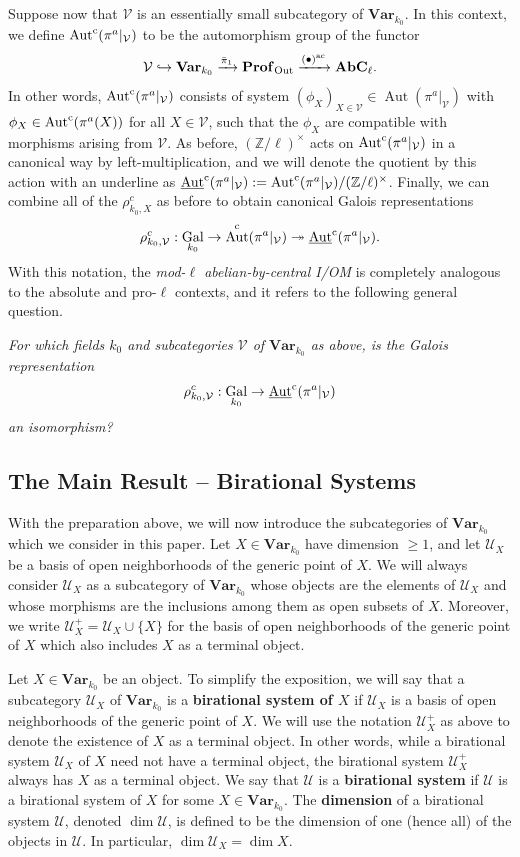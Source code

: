\documentclass[11pt]{amsart}
\theoremstyle{definition}
\theoremstyle{remark}
\numberwithin{equation}{section}
\DeclareMathOperator{\Aut}{Aut}
\DeclareMathOperator{\Gal}{Gal}
\newcommand{\Z}{\mathbb{Z}}
\newcommand{\Vc}{\mathcal{V}}
\newcommand{\Ucal}{\mathcal{U}}
\newcommand{\Autc}{\Aut^{\rm c}}
\newcommand{\UAutc}{\underline{\Aut}^{\rm c}}
\newcommand{\Profinite}{{\mathbf{Prof}_{\rm Out}}}
\newcommand{\Var}{\mathbf{Var}}
\newcommand{\AbC}{\mathbf{AbC}_{\ell}}
\newcommand{\ac}{{\rm ac}}
\newcommand{\Galk}{{\Gal_{k_0}}}
\begin{document}
Suppose now that $\Vc$ is an essentially small subcategory of $\Var_{k_0}$.
In this context, we define $\Autc(\pi^a|_\Vc)$ to be the automorphism group of the functor
\[ \Vc \hookrightarrow \Var_{k_0} \xrightarrow{\bar\pi_1} \Profinite \xrightarrow{(\bullet)^\ac} \AbC. \]
In other words, $\Autc(\pi^a|_\Vc)$ consists of system $(\phi_X)_{X \in \Vc} \in \Aut(\pi^a|_\Vc)$ with $\phi_X \in \Autc(\pi^a(X))$ for all $X \in \Vc$, such that the $\phi_X$ are compatible with morphisms arising from $\Vc$.
As before, $(\Z/\ell)^\times$ acts on $\Autc(\pi^a|_\Vc)$ in a canonical way by left-multiplication, and we will denote the quotient by this action with an underline as $\UAutc(\pi^a|_\Vc) := \Autc(\pi^a|_\Vc)/(\Z/\ell)^\times$.
Finally, we can combine all of the $\rho_{k_0,X}^c$ as before to obtain canonical Galois representations
\[ \rho_{k_0,\Vc}^c : \Galk \rightarrow \Autc(\pi^a|_\Vc) \twoheadrightarrow \UAutc(\pi^a|_\Vc). \]
With this notation, the \emph{mod-$\ell$ abelian-by-central I/OM} is completely analogous to the absolute and pro-$\ell$ contexts, and it refers to the following general question.

\vskip 5pt
{\em For which fields $k_0$ and subcategories $\Vc$ of $\Var_{k_0}$ as above, is the Galois representation 
\[ \rho^c_{k_0,\Vc} : \Galk \rightarrow \UAutc(\pi^a|_\Vc) \]
an isomorphism?}
\vskip 5pt

\subsection{The Main Result -- Birational Systems}
\label{subsection: intro / main-result-birational-systems}

With the preparation above, we will now introduce the subcategories of $\Var_{k_0}$ which we consider in this paper.
Let $X \in \Var_{k_0}$ have dimension $\geq 1$, and let $\Ucal_X$ be a basis of open neighborhoods of the generic point of $X$.
We will always consider $\Ucal_X$ as a subcategory of $\Var_{k_0}$ whose objects are the elements of $\Ucal_X$ and whose morphisms are the inclusions among them as open subsets of $X$.
Moreover, we write $\Ucal_X^+ = \Ucal_X \cup \{X\}$ for the basis of open neighborhoods of the generic point of $X$ which also includes $X$ as a terminal object.

Let $X \in \Var_{k_0}$ be an object.
To simplify the exposition, we will say that a subcategory $\Ucal_X$ of $\Var_{k_0}$ is a {\bf birational system of $X$} if $\Ucal_X$ is a basis of open neighborhoods of the generic point of $X$.
We will use the notation $\Ucal_X^+$ as above to denote the existence of $X$ as a terminal object.
In other words, while a birational system $\Ucal_X$ of $X$ need not have a terminal object, the birational system $\Ucal^+_X$ always has $X$ as a terminal object.
We say that $\Ucal$ is a {\bf birational system} if $\Ucal$ is a birational system of $X$ for some $X \in \Var_{k_0}$.
The {\bf dimension} of a birational system $\Ucal$, denoted $\dim \Ucal$, is defined to be the dimension of one (hence all) of the objects in $\Ucal$.
In particular, $\dim\Ucal_X = \dim X$.
\end{document}
